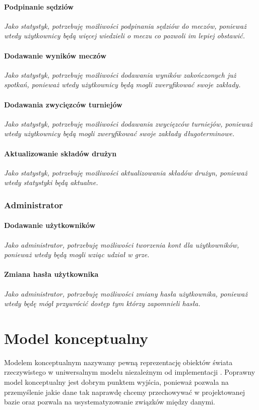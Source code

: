 \documentclass{mwrep}
\begin{document}
\subsubsection{Podpinanie sędziów}
\emph{Jako statystyk, potrzebuję możliwości podpinania sędziów do meczów, ponieważ wtedy użytkownicy będą więcej wiedzieli o meczu co pozwoli im lepiej obstawić.}

\subsubsection{Dodawanie wyników meczów}
\emph{Jako statystyk, potrzebuję możliwości dodawania wyników zakończonych już spotkań, ponieważ wtedy użytkownicy będą mogli zweryfikować swoje zakłady.}

\subsubsection{Dodawania zwycięzców turniejów}
\emph{Jako statystyk, potrzebuję możliwości dodawania zwycięzców turniejów, ponieważ wtedy użytkownicy będą mogli zweryfikować swoje zakłady długoterminowe.}

\subsubsection{Aktualizowanie składów drużyn}
\emph{Jako statystyk, potrzebuję możliwości aktualizowania składów drużyn, ponieważ wtedy statystyki będą aktualne.}


\subsection{Administrator}
\subsubsection{Dodawanie użytkowników}
\emph{Jako administrator, potrzebuję możliwości tworzenia kont dla użytkowników, ponieważ wtedy będą mogli wziąc udział w grze.}

\subsubsection{Zmiana hasła użytkownika}
\emph{Jako administrator, potrzebuję możliwości zmiany hasła użytkownika, ponieważ wtedy będę mógł przywrócić dostęp tym którzy zapomnieli hasła.}


\chapter{Model konceptualny}
Modelem konceptualnym nazywamy pewną reprezentację obiektów świata rzeczywistego 
w uniwersalnym modelu niezależnym od implementacji \cite{Wrembel1}. Poprawny model 
konceptualny jest dobrym punktem wyjścia, ponieważ pozwala na przemyślenie jakie
dane tak naprawdę chcemy przechowywać w projektowanej bazie oraz pozwala na usystematyzowanie
związków między danymi.
\end{document}
